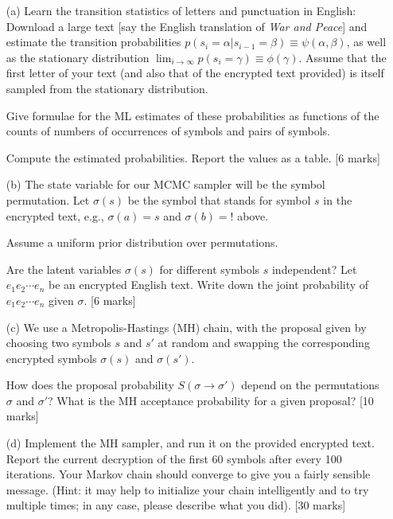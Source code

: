 \documentclass{article}
\begin{document}
\begin{enumerate}

    \item[(a)] Learn the transition statistics of letters and punctuation in English: Download a large text [say the English translation of \textit{War and Peace}] and estimate the transition probabilities \( p(s_i = \alpha | s_{i-1} = \beta) \equiv \psi(\alpha, \beta) \), as well as the stationary distribution \( \lim_{i \to \infty} p(s_i = \gamma) \equiv \phi(\gamma) \). Assume that the first letter of your text (and also that of the encrypted text provided) is itself sampled from the stationary distribution.
    
    Give formulae for the ML estimates of these probabilities as functions of the counts of numbers of occurrences of symbols and pairs of symbols.
    
    Compute the estimated probabilities. Report the values as a table. [6 marks]

    \item[(b)] The state variable for our MCMC sampler will be the symbol permutation. Let \( \sigma(s) \) be the symbol that stands for symbol \( s \) in the encrypted text, e.g., \( \sigma(a) = s \) and \( \sigma(b) = ! \) above.
    
    Assume a uniform prior distribution over permutations.
    
    Are the latent variables \( \sigma(s) \) for different symbols \( s \) independent? Let \( e_1 e_2 \cdots e_n \) be an encrypted English text. Write down the joint probability of \( e_1 e_2 \cdots e_n \) given \( \sigma \). [6 marks]

    \item[(c)] We use a Metropolis-Hastings (MH) chain, with the proposal given by choosing two symbols \( s \) and \( s' \) at random and swapping the corresponding encrypted symbols \( \sigma(s) \) and \( \sigma(s') \).
    
    How does the proposal probability \( S(\sigma \rightarrow \sigma') \) depend on the permutations \( \sigma \) and \( \sigma' \)? What is the MH acceptance probability for a given proposal? [10 marks]

    \item[(d)] Implement the MH sampler, and run it on the provided encrypted text. Report the current decryption of the first 60 symbols after every 100 iterations. Your Markov chain should converge to give you a fairly sensible message. (Hint: it may help to initialize your chain intelligently and to try multiple times; in any case, please describe what you did). [30 marks]


\end{enumerate}
\end{document}
